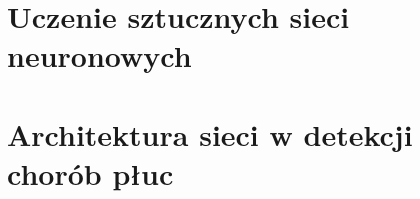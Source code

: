 \documentclass{article}
\begin{document}
\section{Uczenie sztucznych sieci neuronowych}



\section{Architektura sieci w detekcji chorób płuc}





	
\end{document}
